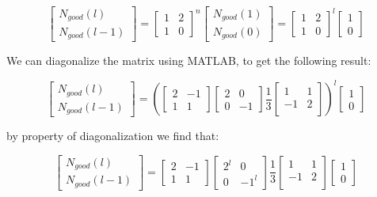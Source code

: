 \documentclass[11pt, letterpaper]{article}
\begin{document}
\begin{enumerate}[label=(\alph*)]
\[
\begin{bmatrix}
N_{good}(l) \\
N_{good}(l - 1)
\end{bmatrix}
=
\begin{bmatrix}
1 & 2 \\
1 & 0
\end{bmatrix}^n
\begin{bmatrix}
N_{good}(1) \\
N_{good}(0)
\end{bmatrix}
=
\begin{bmatrix}
1 & 2 \\
1 & 0 
\end{bmatrix}^l
\begin{bmatrix}
1 \\
0 
\end{bmatrix}
\]

We can diagonalize the matrix using MATLAB, to get the following result:

\[
\begin{bmatrix}
N_{good}(l) \\
N_{good}(l - 1)
\end{bmatrix}
=
\left( 
\begin{bmatrix}
2 & -1 \\
1 & 1
\end{bmatrix}
\begin{bmatrix}
2 & 0 \\
0 & -1
\end{bmatrix}
\frac{1}{3}
\begin{bmatrix}
1 & 1 \\
-1 & 2 \\
\end{bmatrix}\right)^l
\begin{bmatrix}
1 \\
0 
\end{bmatrix}
\]

by property of diagonalization we find that:

\[
\begin{bmatrix}
N_{good}(l) \\
N_{good}(l - 1)
\end{bmatrix}
=
\begin{bmatrix}
2 & -1 \\
1 & 1
\end{bmatrix}
\begin{bmatrix}
2^l & 0 \\
0 & -1^l
\end{bmatrix}
\frac{1}{3}
\begin{bmatrix}
1 & 1 \\
-1 & 2 \\
\end{bmatrix}
\begin{bmatrix}
1 \\
0 
\end{bmatrix}
\]


\end{enumerate}
\end{document}
